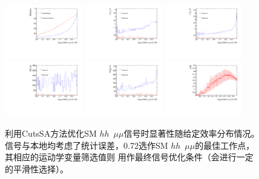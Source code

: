 \begin{figure}[h]
\begin{center}
\includegraphics[width = 0.3\textwidth,angle=-90]{fig/SigOpt/nonres/Efficiency_mumu.pdf}
\includegraphics[width = 0.3\textwidth,angle=-90]{fig/SigOpt/nonres/mindR_l2j_mumu.pdf}
\includegraphics[width = 0.3\textwidth,angle=-90]{fig/SigOpt/nonres/mindR_l1j_mumu.pdf}
\includegraphics[width = 0.3\textwidth,angle=-90]{fig/SigOpt/nonres/m_ll_mumu.pdf}
\includegraphics[width = 0.3\textwidth,angle=-90]{fig/SigOpt/nonres/m_l1jj_mumu.pdf}
\includegraphics[width = 0.3\textwidth,angle=-90]{fig/SigOpt/nonres/SOverRootB_mumu.pdf}
\caption{利用CutsSA方法优化SM $hh$~$\mu\mu$信号时显著性随给定效率分布情况。信号与本地均考虑了统计误差，0.72选作SM $hh$~$\mu\mu$的最佳工作点，其相应的运动学变量筛选值则
用作最终信号优化条件（会进行一定的平滑性选择）。}
\label{fig:nonres:SigOpt_mumu}
\end{center}
\end{figure}

